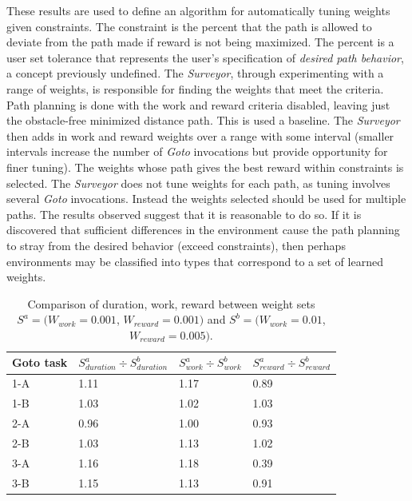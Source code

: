 \documentclass{tamuccthesis}
\begin{document}
These results are used to define an algorithm for automatically tuning weights given constraints. The constraint is the percent that the path is allowed to deviate from the path made if reward is not being maximized. The percent is a user set tolerance that represents the user's specification of \textit{desired path behavior}, a concept previously undefined. The \textit{Surveyor}, through experimenting with a range of weights, is responsible for finding the weights that meet the criteria. Path planning is done with the work and reward criteria disabled, leaving just the obstacle-free minimized distance path. This is used a baseline. The \textit{Surveyor} then adds in work and reward weights over a range with some interval (smaller intervals increase the number of \textit{Goto} invocations but provide opportunity for finer tuning). The weights whose path gives the best reward within constraints is selected. The \textit{Surveyor} does not tune weights for each path, as tuning involves several \textit{Goto} invocations. Instead the weights selected should be used for multiple paths. The results observed suggest that it is reasonable to do so. If it is discovered that sufficient differences in the environment cause the path planning to stray from the desired behavior (exceed constraints), then perhaps environments may be classified into types that correspond to a set of learned weights. 

\begin{table}[H]
    \centering
    \begin{tabular}{|l|l|l|l|}
        \hline
        Goto task & $S^a_{duration} \div S^b_{duration}$ & $S^a_{work} \div S^b_{work}$ & $S^a_{reward} \div S^b_{reward}$ \\
        \hline
        1-A & 1.11 & 1.17 & 0.89 \\
        \hline
        1-B & 1.03 & 1.02 & 1.03 \\
        \hline
        2-A & 0.96 & 1.00 & 0.93 \\
        \hline
        2-B & 1.03 & 1.13 & 1.02 \\
        \hline
        3-A & 1.16 & 1.18 & 0.39 \\
        \hline
        3-B &  1.15 & 1.13 & 0.91 \\
        \hline
    \end{tabular}
    \caption[Varying optimization criteria weights, weight sets $S^a$ and $S^b$.]{Comparison of duration, work, reward between weight sets $S^a = (W_{work} = 0.001$, $W_{reward} = 0.001)$ and $S^b = (W_{work} = 0.01$, $W_{reward} = 0.005)$.}
    \label{tbl:weightDiff_a_b}
\end{table}
\end{document}

